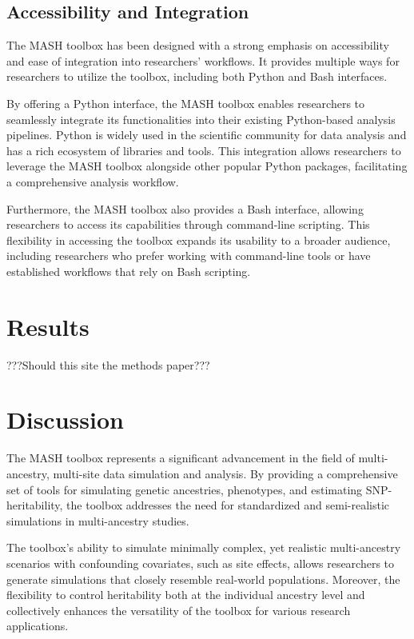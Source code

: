 \documentclass[sn-nature]{sn-jnl}%
\begin{document}
\subsection{Accessibility and Integration}
The MASH toolbox has been designed with a strong emphasis on accessibility and ease of integration into researchers' workflows. It provides multiple ways for researchers to utilize the toolbox, including both Python and Bash interfaces.

By offering a Python interface, the MASH toolbox enables researchers to seamlessly integrate its functionalities into their existing Python-based analysis pipelines. Python is widely used in the scientific community for data analysis and has a rich ecosystem of libraries and tools. This integration allows researchers to leverage the MASH toolbox alongside other popular Python packages, facilitating a comprehensive analysis workflow.

Furthermore, the MASH toolbox also provides a Bash interface, allowing researchers to access its capabilities through command-line scripting. This flexibility in accessing the toolbox expands its usability to a broader audience, including researchers who prefer working with command-line tools or have established workflows that rely on Bash scripting.

\section{Results}\label{sec:results}
???Should this site the methods paper???


\section{Discussion}\label{sec:discussion}

The MASH toolbox represents a significant advancement in the field of multi-ancestry, multi-site data simulation and analysis. By providing a comprehensive set of tools for simulating genetic ancestries, phenotypes, and estimating SNP-heritability, the toolbox addresses the need for standardized and semi-realistic simulations in multi-ancestry studies.

The toolbox's ability to simulate minimally complex, yet realistic multi-ancestry scenarios with confounding covariates, such as site effects, allows researchers to generate simulations that closely resemble real-world populations. Moreover, the flexibility to control heritability both at the individual ancestry level and collectively enhances the versatility of the toolbox for various research applications.
\end{document}
